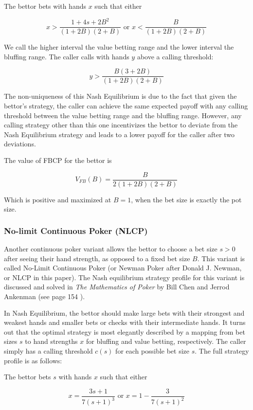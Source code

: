 \documentclass[../../main/main.tex]{subfiles}
\begin{document}
The bettor bets with hands $x$ such that either 

$$x > \frac{1 + 4s + 2B^2}{(1+2B)(2+B)} \text{ or } x < \frac{B}{(1+2B)(2+B)}$$

We call the higher interval the value betting range and the lower interval the bluffing range. The caller calls with hands $y$ above a calling threshold:

$$ y > \frac{B(3 +2B)}{(1+2B)(2+B)} $$

The non-uniqueness of this Nash Equilibrium is due to the fact that given the bettor's strategy, the caller can achieve the same expected payoff with any calling threshold between the value betting range and the bluffing range. However, any calling strategy other than this one incentivizes the bettor to deviate from the Nash Equilibrium strategy and leads to a lower payoff for the caller after two deviations. 

The value of FBCP for the bettor is 

$$ V_{FB}(B) = \frac{B}{2(1+2B)(2+B)} $$

Which is positive and maximized at $B = 1$, when the bet size is exactly the pot size. 

\subsubsection{No-limit Continuous Poker (NLCP)}
Another continuous poker variant allows the bettor to choose a bet size $s > 0$ after seeing their hand strength, as opposed to a fixed bet size $B$. This variant is called No-Limit Continuous Poker (or Newman Poker after Donald J. Newman, or NLCP in this paper). The Nash equilibrium strategy profile for this variant is discussed and solved in \textit{The Mathematics of Poker} by Bill Chen and Jerrod Ankenman (see page 154 ). 

In Nash Equilibrium, the bettor should make large bets with their strongest and weakest hands and smaller bets or checks with their intermediate hands. It turns out that the optimal strategy is most elegantly described by a mapping from bet sizes $s$ to hand strengths $x$ for bluffing and value betting, respectively. The caller simply has a calling threshold $c(s)$ for each possible bet size $s$. The full strategy profile is as follows:

The bettor bets $s$ with hands $x$ such that either

$$ x = \frac{3 s+1}{7 (s+1)^3} \text{ or } x = 1 - \frac{3}{7 (s+1)^2} $$
\end{document}
